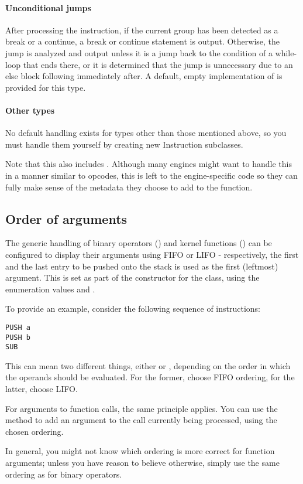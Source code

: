 \paragraph{Unconditional jumps}
After processing the instruction, if the current group has been detected as a break or a continue, a break or continue statement is output. Otherwise, the jump is analyzed and output unless it is a jump back to the condition of a while-loop that ends there, or it is determined that the jump is unnecessary due to an else block following immediately after. A default, empty implementation of  is provided for this type.

\paragraph{Other types}
No default handling exists for types other than those mentioned above, so you must handle them yourself by creating new Instruction subclasses.

Note that this also includes . Although many engines might want to handle this in a manner similar to  opcodes, this is left to the engine-specific code so they can fully make sense of the metadata they choose to add to the function.

\subsection{Order of arguments}
\label{sec:argOrder}
The generic handling of binary operators () and kernel functions () can be configured to display their arguments using FIFO or LIFO - respectively, the first and the last entry to be pushed onto the stack is used as the first (leftmost) argument. This is set as part of the constructor for the  class, using the enumeration values  and .

To provide an example, consider the following sequence of instructions:

\begin{bytecode}
\begin{lstlisting}
PUSH a
PUSH b
SUB
\end{lstlisting}
\end{bytecode}

This can mean two different things, either  or , depending on the order in which the operands should be evaluated. For the former, choose FIFO ordering, for the latter, choose LIFO.

For arguments to function calls, the same principle applies. You can use the  method to add an argument to the call currently being processed, using the chosen ordering.

In general, you might not know which ordering is more correct for function arguments; unless you have reason to believe otherwise, simply use the same ordering as for binary operators.
